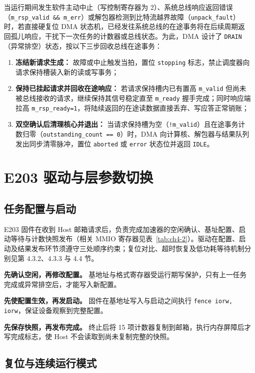 \documentclass[UTF8,a4paper,zihao=-4,fontset=none,openany,oneside]{ctexrep}
\begin{document}
当运行期间发生软件主动中止（写控制寄存器为 2）、系统总线响应返回错误（\texttt{m\_rsp\_valid \&\& m\_err}）或解包器检测到比特流越界故障（\texttt{unpack\_fault}）时，若直接硬复位 DMA 状态机，已经发往系统总线的在途事务将在后续周期返回孤儿响应，干扰下一次任务的计数器或总线状态。为此，DMA 设计了 \texttt{DRAIN}（异常排空）状态，按以下三步回收总线在途事务：
\begin{enumerate}
\item \textbf{冻结新请求生成：} 故障或中止触发当拍，置位 \texttt{stopping} 标志，禁止调度器向请求保持槽装入新的读或写事务；
\item \textbf{保持已挂起请求并回收在途响应：} 若请求保持槽内已有置高 \texttt{m\_valid} 但尚未被总线接收的请求，继续保持其信号稳定直至 \texttt{m\_ready} 握手完成；同时响应端拉高 \texttt{m\_rsp\_ready=1}，将陆续返回的在途读数据直接丢弃、写应答正常销账；
\item \textbf{双空确认后清理核心并退出：} 当请求保持槽为空（\texttt{!m\_valid}）且在途事务计数归零（\texttt{outstanding\_count == 0}）时，DMA 向计算核、解包器与结果队列发出同步清零脉冲，置位 \texttt{aborted} 或 \texttt{error} 状态位并返回 \texttt{IDLE}。
\end{enumerate}


\section{E203 驱动与层参数切换}

\subsection{任务配置与启动}

E203 固件在收到 Host 邮箱请求后，负责完成加速器的空闲确认、基址配置、启动等待与计数快照发布（相关 MMIO 寄存器见表~\ref{tab:ch4-2}）。驱动在配置、启动及结果发布环节须遵守三处顺序约束；复位对比、超时恢复及低功耗等待机制分别见第 4.3.2、4.3.3 与 4.4 节。

\textbf{先确认空闲，再修改配置。} 基地址与格式寄存器受运行期写保护，只有上一任务完成或异常排空后，才能写入新配置。

\textbf{先使配置生效，再发启动。} 固件在基地址写入与启动之间执行 \texttt{fence iorw, iorw}，保证设备观察到完整配置。

\textbf{先保存快照，再发布完成。} 终止后将 15 项计数器复制到邮箱，执行内存屏障后才写完成标志，使 Host 不会读取到尚未复制完整的快照。

\subsection{复位与连续运行模式}
\end{document}
